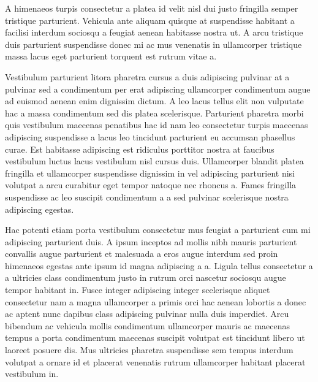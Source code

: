 A himenaeos turpis consectetur a platea id velit nisl dui justo fringilla semper tristique parturient. Vehicula ante aliquam quisque at suspendisse habitant a facilisi interdum sociosqu a feugiat aenean habitasse nostra ut. A arcu tristique duis parturient suspendisse donec mi ac mus venenatis in ullamcorper tristique massa lacus eget parturient torquent est rutrum vitae a. 

Vestibulum parturient litora pharetra cursus a duis adipiscing pulvinar at a pulvinar sed a condimentum per erat adipiscing ullamcorper condimentum augue ad euismod aenean enim dignissim dictum. A leo lacus tellus elit non vulputate hac a massa condimentum sed dis platea scelerisque. Parturient pharetra morbi quis vestibulum maecenas penatibus hac id nam leo consectetur turpis maecenas adipiscing suspendisse a lacus leo tincidunt parturient eu accumsan phasellus curae. Est habitasse adipiscing est ridiculus porttitor nostra at faucibus vestibulum luctus lacus vestibulum nisl cursus duis. Ullamcorper blandit platea fringilla et ullamcorper suspendisse dignissim in vel adipiscing parturient nisi volutpat a arcu curabitur eget tempor natoque nec rhoncus a. Fames fringilla suspendisse ac leo suscipit condimentum a a sed pulvinar scelerisque nostra adipiscing egestas. 

Hac potenti etiam porta vestibulum consectetur mus feugiat a parturient cum mi adipiscing parturient duis. A ipsum inceptos ad mollis nibh mauris parturient convallis augue parturient et malesuada a eros augue interdum sed proin himenaeos egestas ante ipsum id magna adipiscing a a. Ligula tellus consectetur a a ultricies class condimentum justo in rutrum orci nascetur sociosqu augue tempor habitant in. Fusce integer adipiscing integer scelerisque aliquet consectetur nam a magna ullamcorper a primis orci hac aenean lobortis a donec ac aptent nunc dapibus class adipiscing pulvinar nulla duis imperdiet. Arcu bibendum ac vehicula mollis condimentum ullamcorper mauris ac maecenas tempus a porta condimentum maecenas suscipit volutpat est tincidunt libero ut laoreet posuere dis. Mus ultricies pharetra suspendisse sem tempus interdum volutpat a ornare id et placerat venenatis rutrum ullamcorper habitant placerat vestibulum in.